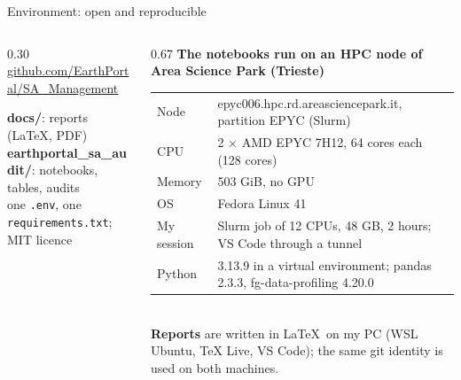 \documentclass[aspectratio=169,10pt]{beamer}
\begin{document}
\begin{frame}{Environment: open and reproducible}
  \begin{columns}[T]
    \begin{column}{0.30\textwidth}
      \centering
      \\[4pt]
      {\scriptsize\href{https://github.com/EarthPortal/SA_Management}{github.com/EarthPortal/SA\_Management}}\\[6pt]
      \raggedright\scriptsize
      \textbf{docs/}: reports (\LaTeX, PDF)\\
      \textbf{earthportal\_sa\_audit/}: notebooks, tables, audits\\
      one \texttt{.env}, one \texttt{requirements.txt}; MIT licence
    \end{column}
    \begin{column}{0.67\textwidth}
      \scriptsize
      \textbf{The notebooks run on an HPC node of Area Science Park (Trieste)}\\[3pt]
      \begin{tabular}{@{}l l@{}}
        \toprule
        Node & epyc006.hpc.rd.areasciencepark.it, partition EPYC (Slurm)\\
        CPU & 2 $\times$ AMD EPYC 7H12, 64 cores each (128 cores)\\
        Memory & 503 GiB, no GPU\\
        OS & Fedora Linux 41\\
        My session & Slurm job of 12 CPUs, 48 GB, 2 hours; VS Code through a tunnel\\
        Python & 3.13.9 in a virtual environment; pandas 2.3.3, fg-data-profiling 4.20.0\\
        \bottomrule
      \end{tabular}\\[6pt]
      \textbf{Reports} are written in \LaTeX\ on my PC (WSL Ubuntu, TeX Live, VS Code);
      the same git identity is used on both machines.
    \end{column}
  \end{columns}
\end{frame}
\end{document}
